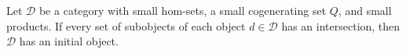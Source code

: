 Let $\mathcal{D}$ be a category with small hom-sets, a small cogenerating set $Q$, and small products. If every set of subobjects of each object $d \in \mathcal{D}$ has an intersection, then $\mathcal{D}$ has an initial object.
